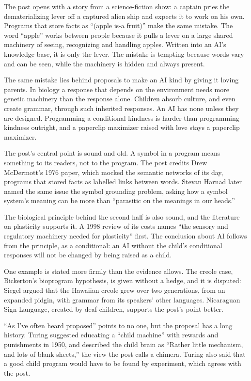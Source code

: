 \begin{afterword}
\summaryhead

The post opens with a story from a science-fiction show: a captain pries the dematerializing lever off a captured alien ship and expects it to work on his own. Programs that store facts as ``(apple is-a fruit)'' make the same mistake. The word ``apple'' works between people because it pulls a lever on a large shared machinery of seeing, recognizing and handling apples. Written into an AI's knowledge base, it is only the lever. The mistake is tempting because words vary and can be seen, while the machinery is hidden and always present.

The same mistake lies behind proposals to make an AI kind by giving it loving parents. In biology a response that depends on the environment needs more genetic machinery than the response alone. Children absorb culture, and even create grammar, through such inherited responses. An AI has none unless they are designed. Programming a conditional kindness is harder than programming kindness outright, and a paperclip maximizer raised with love stays a paperclip maximizer.

\responsehead

The post's central point is sound and old. A symbol in a program means something to its readers, not to the program. The post credits Drew McDermott's 1976 paper, which mocked the semantic networks of its day, programs that stored facts as labelled links between words. Stevan Harnad later named the same issue the symbol grounding problem, asking how a symbol system's meaning can be more than ``parasitic on the meanings in our heads.''

The biological principle behind the second half is also sound, and the literature on plasticity supports it. A 1998 review of its costs names ``the sensory and regulatory machinery needed for plasticity'' first. The conclusion about AI follows from the principle, as a conditional: an AI without the child's conditional responses will not be changed by being raised as a child.

One example is stated more firmly than the evidence allows. The creole case, Bickerton's bioprogram hypothesis, is given without a hedge, and it is disputed: Siegel argued that the Hawaiian creole grew over two generations, from an expanded pidgin, with grammar from its speakers' other languages. Nicaraguan Sign Language, created by deaf children, supports the post's point better.

``As I've often heard proposed'' points to no one, but the proposal has a long history. Turing suggested educating a ``child machine'' with rewards and punishments in 1950, and described the child brain as ``Rather little mechanism, and lots of blank sheets,'' the view the post calls a chimera. Turing also said that a good child program would have to be found by experiment, which agrees with the post.


\end{afterword}
